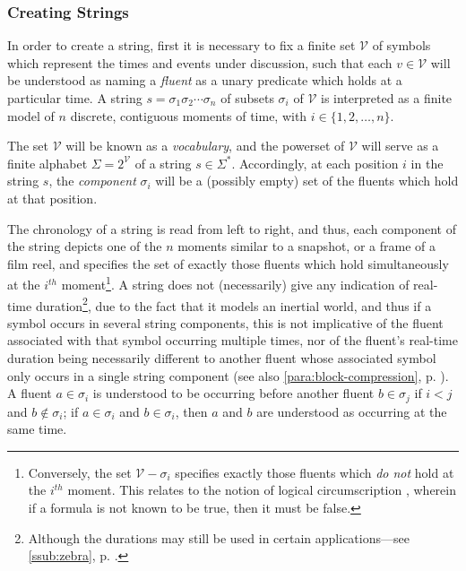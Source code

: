 \documentclass[a4paper,12pt,leqno,twoside]{article}
\newcommand{\V}{\mathcal{V}}
\newcommand{\nb}[1]{{\color{red}[NB\footnote{{\color{red}#1}}]}}
\begin{document}
\subsubsection{Creating Strings}\label{ssub:creating}
In order to create a string, first it is necessary to fix a finite set $\V$ of symbols which represent the times and events under discussion, such that each $v \in \V$ will be understood as naming a \textit{fluent} as a unary predicate which holds at a particular time. A string $s = \sigma_1\sigma_2\cdots\sigma_n$ of subsets $\sigma_i$ of $\V$ is interpreted as a finite model of $n$ discrete, contiguous moments of time, with $i \in \{1, 2, \ldots, n\}$.

The set $\V$ will be known as a \textit{vocabulary}, and the powerset of $\V$ will serve as a finite alphabet $\Sigma = 2^{\V}$ of a string $s \in \Sigma^*$. Accordingly, at each position $i$ in the string $s$, the \textit{component} $\sigma_i$ will be a (possibly empty) set of the fluents which hold at that position.

The chronology of a string is read from left to right, and thus, each component of the string depicts one of the $n$ moments similar to a snapshot, or a frame of a film reel, and specifies the set of exactly those fluents which hold simultaneously at the $i^{th}$ moment\footnote{Conversely, the set $\V-\sigma_i$ specifies exactly those fluents which \textit{do not} hold at the $i^{th}$ moment. This relates to the notion of logical circumscription \citep{mccarthy1980circumscription}, wherein if a formula is not known to be true, then it must be false.}. A string does not (necessarily) give any indication of real-time duration\footnote{Although the durations may still be used in certain applications---see \cref{ssub:zebra}, p. \pageref{tab:rel-durations}.}, due to the fact that it models an inertial world, and thus if a symbol occurs in several string components, this is not implicative of the fluent associated with that symbol occurring multiple times, nor of the fluent's real-time duration being necessarily different to another fluent whose associated symbol only occurs in a single string component (see also \cref{para:block-compression}, p. \pageref{para:block-compression}). A fluent $a \in \sigma_i$ is understood to be occurring before another fluent $b \in \sigma_j$ if $i < j$ and $b \notin \sigma_i$; if $a \in \sigma_i$ and $b \in \sigma_i$, then $a$ and $b$ are understood as occurring at the same time.%
\end{document}
